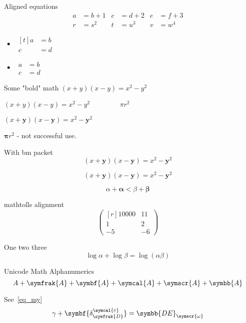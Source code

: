 \documentclass[fleqn,leqno]{article}
\begin{document}
Aligned equations
\begin{align*}
a &= b+1 & c &= d+2 & e &= f+3 \\
r &= s^{2} & t &=u^{3} & v &= w^{4}
\end{align*}

\begin{itemize}
\item
$\begin{aligned}[t]
a&=b\\
c&=d
\end{aligned}$
\item
$\begin{aligned}
a&=b\\
c&=d
\end{aligned}$
\end{itemize}


Some "bold" math
$(x+y)(x-y)=x^{2}-y^{2}$

{\boldmath $(x+y)(x-y)=x^{2}-y^{2}$ $\qquad \qquad \pi r^2$}

$(x+\mathbf{y})(x-\mathbf{y})=x^{2}-{\mathbf{y}}^{2}$

$\mathbf{\pi} r^2$ - not successful use. %

With bm packet
$$(x+\mathbf{y})(x-\mathbf{y})=x^{2}-{\mathbf{y}}^{2}$$

$$(x+\symbf{y})(x-\symbf{y}) \symbf{=} x^{2}-{\symbf{y}}^{2}$$

$$\alpha + \symbf{\alpha} < \beta + \symbf{\beta}$$


mathtolls alignment
\[
\begin{pmatrix*}[r]
10000&11\\
1&2\\
-5&-6
\end{pmatrix*}
\]


One two three
\[
\log \alpha + \log \beta = \log(\alpha\beta)
\]

Unicode Math Alphanumerics
\[A + \symfrak{A}+\symbf{A}+ \symcal{A} + \symscr{A}+\symbb{A}\]



See~\eqref{eq_my}
\begin{equation}\label{eq_my}
\gamma + \symbf{\delta_{\symfrak{D}}^{\symcal{\varepsilon}}} = \symbb{DE}_{\symscr{\omega}}
\end{equation}
\end{document}
